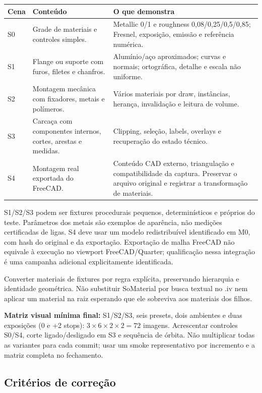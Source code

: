 \documentclass[11pt,a4paper]{article}
\begin{document}
\begin{longtable}{P{.10\linewidth}P{.31\linewidth}P{.49\linewidth}}
\toprule Cena & Conteúdo & O que demonstra\\\midrule\endhead
S0 & Grade de materiais e controles simples. & Metallic 0/1 e roughness 0,08/0,25/0,5/0,85; Fresnel, exposição, emissão e referência numérica.\\
S1 & Flange ou suporte com furos, filetes e chanfros. & Alumínio/aço aproximados; curvas e normais; ortográfica, detalhe e escala não uniforme.\\
S2 & Montagem mecânica com fixadores, metais e polímeros. & Vários materiais por draw, instâncias, herança, invalidação e leitura de volume.\\
S3 & Carcaça com componentes internos, cortes, arestas e medidas. & Clipping, seleção, labels, overlays e recuperação do estado técnico.\\
S4 & Montagem real exportada do FreeCAD. & Conteúdo CAD externo, triangulação e compatibilidade da captura. Preservar o arquivo original e registrar a transformação de materiais.\\\bottomrule
\end{longtable}

S1/S2/S3 podem ser fixtures procedurais pequenos, determinísticos e próprios do teste. Parâmetros dos metais são exemplos de aparência, não medições certificadas de ligas. S4 deve usar um modelo redistribuível identificado em M0, com hash do original e da exportação. Exportação de malha FreeCAD não equivale à execução no viewport FreeCAD/Quarter; qualificação nessa integração é uma campanha adicional explicitamente identificada.

Converter materiais de fixtures por regra explícita, preservando hierarquia e identidade geométrica. Não substituir SoMaterial por busca textual no .iv nem aplicar um material na raiz esperando que ele sobreviva aos materiais dos filhos.

\textbf{Matriz visual mínima final:} S1/S2/S3, seis presets, dois ambientes e duas exposições (0 e +2 stops): $3\times6\times2\times2=72$ imagens. Acrescentar controles S0/S4, corte ligado/desligado em S3 e sequência de órbita. Não multiplicar todas as variantes para cada commit; usar um smoke representativo por incremento e a matriz completa no fechamento.

\subsection{Critérios de correção}
\end{document}
